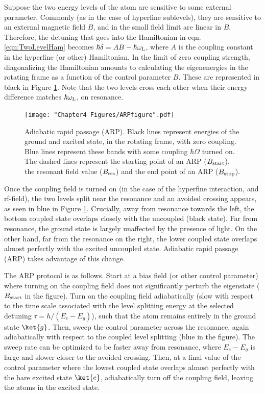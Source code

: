 Suppose the two energy levels of the atom are sensitive to some external parameter. Commonly (as in the case of hyperfine sublevels), they are sensitive to an external magnetic field $B$, and in the small field limit are linear in $B$. Therefore, the detuning that goes into the Hamiltonian in eqn. \ref{eqn:TwoLevelHam} becomes $\hbar\delta = AB - \hbar\omega_{\rm L}$, where $A$ is the coupling constant in the hyperfine (or other) Hamiltonian.   In the limit of zero coupling strength, diagonalizing the Hamiltonian amounts to calculating the eigenenergies in the rotating frame as a function of the control parameter $B$. These are represented in black in Figure \ref{fig:ARPfigure}. Note that the two levels cross each other when their energy difference matches $\hbar\omega_{\rm L}$, on resonance.
\begin{figure}
	\texttt{[image: "Chapter4 Figures/ARPfigure".pdf]}
\caption[Adiabatic rapid passage (ARP)]{Adiabatic rapid passage (ARP). Black lines represent energies of the ground and excited state, in the rotating frame, with zero coupling. Blue lines represent these bands with some coupling $\hbar\Omega$ turned on. The dashed lines represent the starting point of an ARP ($B_{\rm start}$), the resonant field value ($B_{\rm res}$) and the end point of an ARP ($B_{\rm stop}$).}
\label{fig:ARPfigure}
\end{figure}

Once the coupling field is turned on (in the case of the hyperfine interaction, and rf-field), the two levels split near the resonance and an avoided crossing appears, as seen in blue in Figure \ref{fig:ARPfigure}. Crucially, away from resonance towards the left, the bottom coupled state overlaps closely with the uncoupled (black state). Far from resonance, the ground state is largely unaffected by the presence of light. On the other hand, far from the resonance on the right, the lower coupled state overlaps almost perfectly with the excited uncoupled state. Adiabatic rapid passage (ARP) takes advantage of this change.

The ARP protocol is as follows. Start at a bias field (or other control parameter) where turning on the coupling field does not significantly perturb the eigenstate ($B_{\rm start}$ in the figure). Turn on the coupling field adiabatically (slow with respect to the time scale associated with the level splitting energy at the selected detuning $\tau = h/(E_{e}-E_{g})$), such that the atom remains entirely in the ground state $\ket{g}$. Then, sweep the control parameter across the resonance, again adiabatically with respect to the coupled level splitting (blue in the figure). The sweep rate can be optimized to be faster away from resonance, where $E_{e}-E_{g}$ is large and slower closer to the avoided crossing. Then, at a final value of the control parameter where the lowest coupled state overlaps almost perfectly with the bare excited state $\ket{e}$, adiabatically turn off the coupling field, leaving the atoms in the excited state. 

